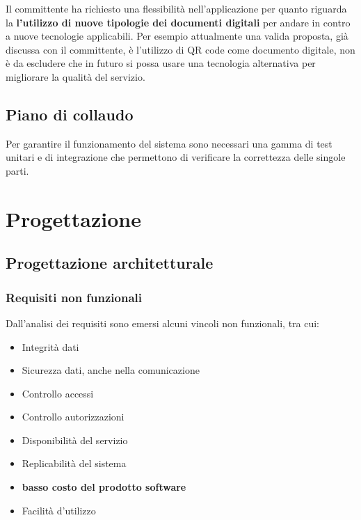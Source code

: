 \documentclass[a4paper]{article}
\begin{document}
Il committente ha richiesto una flessibilità nell'applicazione per quanto riguarda la \textbf{l'utilizzo di nuove tipologie dei documenti digitali} per andare in contro a nuove tecnologie applicabili. Per esempio attualmente una valida proposta, già discussa con il committente, è l'utilizzo di QR code come documento digitale, non è da escludere che in futuro si possa usare una tecnologia alternativa per migliorare la qualità del servizio.   

\newpage

\subsection{Piano di collaudo}

Per garantire il funzionamento del sistema sono necessari una gamma di test unitari e
di integrazione che permettono di verificare la correttezza delle singole parti.




\newpage

\section{Progettazione}

\subsection{Progettazione architetturale}

\subsubsection{Requisiti non funzionali}

Dall’analisi dei requisiti sono emersi alcuni vincoli non funzionali, tra cui:

\begin{itemize}
    \item Integrità dati
    \item Sicurezza dati, anche nella comunicazione
    \item Controllo accessi
    \item Controllo autorizzazioni
    \item Disponibilità del servizio
    \item Replicabilità del sistema
    \item \textbf{basso costo del prodotto software}
    \item Facilità d’utilizzo
\end{itemize}
\end{document}
